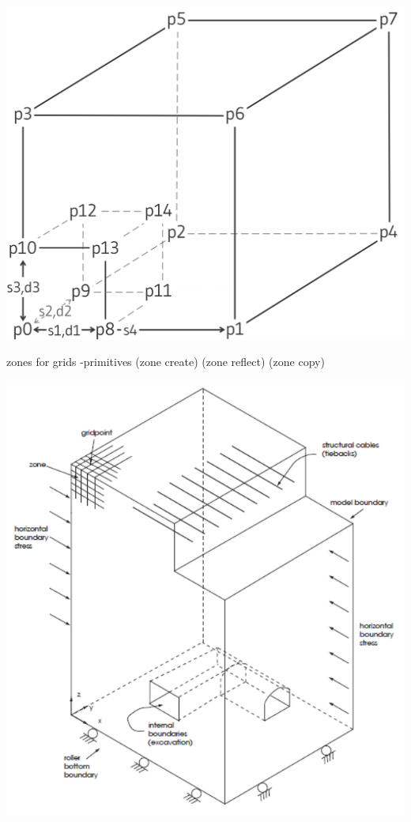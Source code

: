 \documentclass[a4paper, nobind]{templates/ociamthesis}
\begin{document}
\includegraphics[width=1\linewidth]{myfigureeeeee/radial-square}

zones for grids
-primitives (zone create) (zone reflect) (zone copy)

\includegraphics[width=1\linewidth]{myfigureeeeee/example-FLAC3D-Model}
\end{document}
